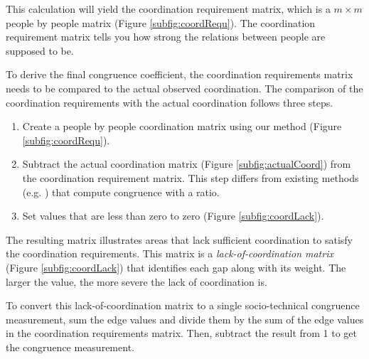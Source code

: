 \documentclass[times, 10pt,twocolumn]{article}
\begin{document}
This calculation will yield the coordination requirement matrix, which is a $m\times m$ people by people matrix (Figure \ref{subfig:coordRequ}).
The coordination requirement matrix tells you how strong the relations between people are supposed to be.



To derive the final congruence coefficient, the coordination requirements matrix needs to be compared to the actual observed coordination.
The comparison of the coordination requirements with the actual coordination follows three steps.

\begin{enumerate}
\item Create a people by people coordination matrix using our method (Figure \ref{subfig:coordRequ}).
\item Subtract the actual coordination matrix (Figure \ref{subfig:actualCoord}) from the coordination requirement matrix. This step differs from existing methods (e.g. \cite{cataldo2006:coordination_reqs,valetto2007}) that compute congruence with a ratio.
\item Set values that are less than zero to zero (Figure \ref{subfig:coordLack}).
\end{enumerate}

The resulting matrix illustrates areas that lack sufficient coordination to satisfy the coordination requirements. This matrix is  a \emph{lack-of-coordination matrix}  (Figure \ref{subfig:coordLack}) that identifies each gap along with its weight. The larger the value, the more severe the lack of coordination is.

To convert this lack-of-coordination matrix to a single socio-technical congruence measurement, sum the edge values and divide them by the sum of the edge values in the coordination requirements matrix. Then, subtract the result from 1 to get the congruence measurement.


\end{document}
